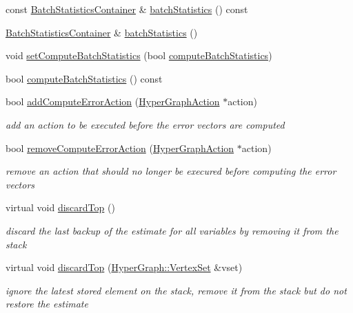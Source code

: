 \begin{DoxyCompactItemize}
\item 
const \mbox{\hyperlink{namespaceg2o_a526b32fde21f83173acb2bb29db68275}{Batch\+Statistics\+Container}} \& \mbox{\hyperlink{classg2o_1_1_sparse_optimizer_a7eede0614bcccf8707480c53071da8f8}{batch\+Statistics}} () const
\item 
\mbox{\hyperlink{namespaceg2o_a526b32fde21f83173acb2bb29db68275}{Batch\+Statistics\+Container}} \& \mbox{\hyperlink{classg2o_1_1_sparse_optimizer_aa93ecf8d3b99e2eef3709a5c70cc8632}{batch\+Statistics}} ()
\item 
void \mbox{\hyperlink{classg2o_1_1_sparse_optimizer_a775fe12d7df941acbbd86bcf838f0f3c}{set\+Compute\+Batch\+Statistics}} (bool \mbox{\hyperlink{classg2o_1_1_sparse_optimizer_ad8dfc896595b27ea0315862acb54f5f2}{compute\+Batch\+Statistics}})
\item 
bool \mbox{\hyperlink{classg2o_1_1_sparse_optimizer_ad8dfc896595b27ea0315862acb54f5f2}{compute\+Batch\+Statistics}} () const
\item 
bool \mbox{\hyperlink{classg2o_1_1_sparse_optimizer_a43517d9f9f23ba6041061c57dddd916d}{add\+Compute\+Error\+Action}} (\mbox{\hyperlink{classg2o_1_1_hyper_graph_action}{Hyper\+Graph\+Action}} $\ast$action)
\begin{DoxyCompactList}\small\item\em add an action to be executed before the error vectors are computed \end{DoxyCompactList}\item 
bool \mbox{\hyperlink{classg2o_1_1_sparse_optimizer_aaeb1bffea0c80d98b6650cbf51be2b80}{remove\+Compute\+Error\+Action}} (\mbox{\hyperlink{classg2o_1_1_hyper_graph_action}{Hyper\+Graph\+Action}} $\ast$action)
\begin{DoxyCompactList}\small\item\em remove an action that should no longer be execured before computing the error vectors \end{DoxyCompactList}\item 
virtual void \mbox{\hyperlink{classg2o_1_1_sparse_optimizer_a368b5f22dbc57abd2f651a20d039f61c}{discard\+Top}} ()
\begin{DoxyCompactList}\small\item\em discard the last backup of the estimate for all variables by removing it from the stack \end{DoxyCompactList}\item 
virtual void \mbox{\hyperlink{classg2o_1_1_sparse_optimizer_a74cbd91a3e05c1f497b4675b0e70113a}{discard\+Top}} (\mbox{\hyperlink{classg2o_1_1_hyper_graph_a703938cdb4bb636860eed55a2489d70c}{Hyper\+Graph\+::\+Vertex\+Set}} \&vset)
\begin{DoxyCompactList}\small\item\em ignore the latest stored element on the stack, remove it from the stack but do not restore the estimate \end{DoxyCompactList}\end{DoxyCompactItemize}
